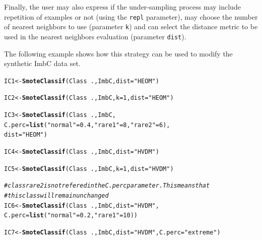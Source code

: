 \documentclass[10pt,a4paper]{article}\usepackage[]{graphicx}\usepackage[]{color}
\makeatletter
\newcommand{\hlnum}[1]{\textcolor[rgb]{0.686,0.059,0.569}{#1}}%
\newcommand{\hlstr}[1]{\textcolor[rgb]{0.192,0.494,0.8}{#1}}%
\newcommand{\hlcom}[1]{\textcolor[rgb]{0.678,0.584,0.686}{\textit{#1}}}%
\newcommand{\hlopt}[1]{\textcolor[rgb]{0,0,0}{#1}}%
\newcommand{\hlstd}[1]{\textcolor[rgb]{0.345,0.345,0.345}{#1}}%
\newcommand{\hlkwb}[1]{\textcolor[rgb]{0.69,0.353,0.396}{#1}}%
\newcommand{\hlkwc}[1]{\textcolor[rgb]{0.333,0.667,0.333}{#1}}%
\newcommand{\hlkwd}[1]{\textcolor[rgb]{0.737,0.353,0.396}{\textbf{#1}}}%
\newenvironment{kframe}{%
 \def\at@end@of@kframe{}%
 \ifinner\ifhmode%
  \def\at@end@of@kframe{\end{minipage}}%
  \begin{minipage}{\columnwidth}%
 \fi\fi%
 \def\FrameCommand##1{\hskip\@totalleftmargin \hskip-\fboxsep
 \colorbox{shadecolor}{##1}\hskip-\fboxsep
     \hskip-\linewidth \hskip-\@totalleftmargin \hskip\columnwidth}%
 \MakeFramed {\advance\hsize-\width
   \@totalleftmargin\z@ \linewidth\hsize
   \@setminipage}}%
 {\par\unskip\endMakeFramed%
 \at@end@of@kframe}
\newenvironment{knitrout}{}{} %
\makeatother
\begin{document}
Finally, the user may also express if the under-sampling process may include repetition of examples or not (using the \texttt{repl} parameter), may choose the number of nearest neighbors to use (parameter \texttt{k}) and can select the distance metric to be used in the nearest neighbors evaluation (parameter \texttt{dist}). 

The following example shows how this strategy can be used to modify the synthetic ImbC data set.


\begin{knitrout}\footnotesize
{}\color{fgcolor}\begin{kframe}
\begin{alltt}
\hlstd{IC1} \hlkwb{<-} \hlkwd{SmoteClassif}\hlstd{(Class}\hlopt{~}\hlstd{., ImbC,} \hlkwc{dist} \hlstd{=} \hlstr{"HEOM"}\hlstd{)}

\hlstd{IC2} \hlkwb{<-} \hlkwd{SmoteClassif}\hlstd{(Class}\hlopt{~}\hlstd{., ImbC,} \hlkwc{k} \hlstd{=} \hlnum{1}\hlstd{,} \hlkwc{dist}\hlstd{=}\hlstr{"HEOM"}\hlstd{)}

\hlstd{IC3} \hlkwb{<-} \hlkwd{SmoteClassif}\hlstd{(Class}\hlopt{~}\hlstd{., ImbC,}
                    \hlkwc{C.perc} \hlstd{=} \hlkwd{list}\hlstd{(}\hlstr{"normal"} \hlstd{=} \hlnum{0.4}\hlstd{,} \hlstr{"rare1"} \hlstd{=} \hlnum{8}\hlstd{,} \hlstr{"rare2"} \hlstd{=} \hlnum{6}\hlstd{),}
                    \hlkwc{dist} \hlstd{=} \hlstr{"HEOM"}\hlstd{)}

\hlstd{IC4} \hlkwb{<-} \hlkwd{SmoteClassif}\hlstd{(Class}\hlopt{~}\hlstd{., ImbC,} \hlkwc{dist} \hlstd{=} \hlstr{"HVDM"}\hlstd{)}

\hlstd{IC5} \hlkwb{<-} \hlkwd{SmoteClassif}\hlstd{(Class}\hlopt{~}\hlstd{., ImbC,} \hlkwc{k} \hlstd{=} \hlnum{1}\hlstd{,} \hlkwc{dist} \hlstd{=} \hlstr{"HVDM"}\hlstd{)}

\hlcom{# class rare2 is not refered in the C.perc parameter. This means that}
\hlcom{# this class will remain unchanged}
\hlstd{IC6} \hlkwb{<-} \hlkwd{SmoteClassif}\hlstd{(Class}\hlopt{~}\hlstd{., ImbC,} \hlkwc{dist} \hlstd{=} \hlstr{"HVDM"}\hlstd{,}
                    \hlkwc{C.perc} \hlstd{=} \hlkwd{list}\hlstd{(}\hlstr{"normal"}\hlstd{=}\hlnum{0.2}\hlstd{,} \hlstr{"rare1"}\hlstd{=}\hlnum{10}\hlstd{))}

\hlstd{IC7} \hlkwb{<-} \hlkwd{SmoteClassif}\hlstd{(Class}\hlopt{~}\hlstd{., ImbC,} \hlkwc{dist} \hlstd{=} \hlstr{"HVDM"}\hlstd{,} \hlkwc{C.perc}\hlstd{=}\hlstr{"extreme"}\hlstd{)}
\end{alltt}
\end{kframe}
\end{knitrout}
\end{document}
